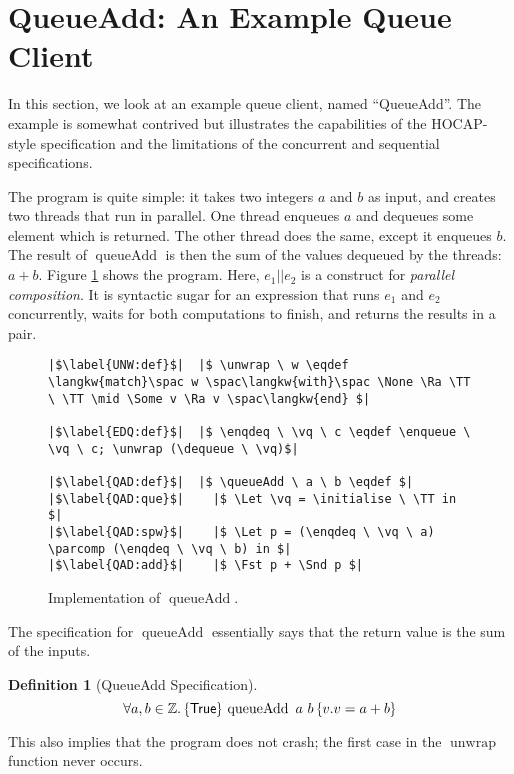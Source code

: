 \documentclass[a4paper, 10pt]{report}
\theoremstyle{definition}
\newtheorem{definition}{Definition}[section]
\newcommand{\initialise}{\operatorname{initialize}}
\newcommand{\enqueue}{\operatorname{enqueue}}
\newcommand{\dequeue}{\operatorname{dequeue}}
\newcommand{\unwrap}{\operatorname{unwrap}}
\newcommand{\enqdeq}{\operatorname{enqdeq}}
\newcommand{\queueAdd}{\operatorname{queueAdd}}
\newcommand{\parcomp}{\ensuremath{\mathbin{||}}}
\newcommand{\vq}{v_q}
\begin{document}
\section{QueueAdd: An Example Queue Client}
\label{QueueSpecs:section:queueadd}
In this section, we look at an example queue client, named ``QueueAdd''. The example is somewhat contrived but illustrates the capabilities of the HOCAP-style specification and the limitations of the concurrent and sequential specifications.

The program is quite simple: it takes two integers $a$ and $b$ as input, and creates two threads that run in parallel. One thread enqueues $a$ and dequeues some element which is returned. The other thread does the same, except it enqueues $b$. The result of $\queueAdd$ is then the sum of the values dequeued by the threads: $a + b$. Figure \ref{QueueSpecs:queueadd:code} shows the program. Here, $e_1 \parcomp e_2$ is a construct for \textit{parallel composition}. It is syntactic sugar for an expression that runs $e_1$ and $e_2$ concurrently, waits for both computations to finish, and returns the results in a pair.

\begin{figure}
\begin{verbatim}
|$\label{UNW:def}$|  |$ \unwrap \ w \eqdef \langkw{match}\spac w \spac\langkw{with}\spac \None \Ra \TT \ \TT \mid \Some v \Ra v \spac\langkw{end} $|

|$\label{EDQ:def}$|  |$ \enqdeq \ \vq \ c \eqdef \enqueue \ \vq \ c; \unwrap (\dequeue \ \vq)$|

|$\label{QAD:def}$|  |$ \queueAdd \ a \ b \eqdef $|
|$\label{QAD:que}$|    |$ \Let \vq = \initialise \ \TT in $|
|$\label{QAD:spw}$|    |$ \Let p = (\enqdeq \ \vq \ a) \parcomp (\enqdeq \ \vq \ b) in $|
|$\label{QAD:add}$|    |$ \Fst p + \Snd p $|
\end{verbatim}
\caption{Implementation of $\queueAdd$.}
\label{QueueSpecs:queueadd:code}
\end{figure}

The specification for $\queueAdd$ essentially says that the return value is the sum of the inputs.
\begin{definition}[QueueAdd Specification]\label{QueueSpecs:spec:queueadd}
  \begin{equation*}
    \All a, b \in \mathbb{Z} . \hoare{\TRUE}{\queueAdd \ a \ b}{v . v = a + b}
  \end{equation*}
\end{definition}
\noindent This also implies that the program does not crash; the first case in the $\unwrap$ function never occurs.
\end{document}
